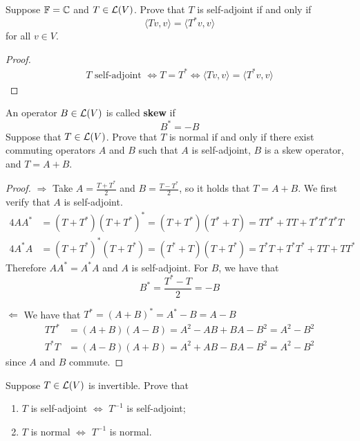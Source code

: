 \documentclass{extarticle}
\begin{document}
\begin{problem}{10}
    Suppose \(\mathbb{F} = \mathbb{C}\) and \(T \in \mathcal{L}(V)\). Prove that \(T\) is self-adjoint if and only if 
    \[\langle Tv,v \rangle = \langle T^* v,v \rangle\]
    for all \(v \in V\).
\end{problem}

\begin{proof}
\begin{align*}
    T \text{ self-adjoint } \Longleftrightarrow
    T = T^* \Longleftrightarrow \langle Tv,v \rangle = \langle T^*v,v \rangle
\end{align*}
\end{proof}

\begin{problem}{12}
    An operator \(B \in \mathcal{L}(V)\) is called \textbf{skew} if 
    \[B^* = - B\]
    Suppose that \(T \in \mathcal{L}(V)\). Prove that \(T\) is normal if and only if there exist commuting 
    operators \(A\) and \(B\) such that \(A\) is self-adjoint, \(B\) is a skew operator, and 
    \(T = A + B\).
\end{problem}

\begin{proof}
\(\Rightarrow\) Take \(A = \frac{T + T^*}{2}\) and \(B = \frac{T - T^*}{2}\), so it holds that 
\(T = A + B\). We first verify that \(A\) is self-adjoint. 
\begin{align*}
    4AA^* &= (T + T^*)(T + T^*)^* = (T + T^*)(T^* + T) = TT^* + TT + T^*T^* T^*T\\ 
    4A^*A &= (T + T^*)^* (T + T^*) = (T^* + T) (T + T^*) = T^*T + T^*T^* + TT + TT^*
\end{align*}
Therefore \(AA^* = A^*A\) and \(A\) is self-adjoint. For \(B\), we have that 
\[B^* = \frac{T^* - T}{2} = - B\]

\(\Leftarrow\) We have that \(T^* = (A+B)^* = A^* - B = A - B\)
\begin{align*}
    TT^* &= (A+B)(A-B) = A^2 - AB + BA - B^2 = A^2 - B^2 \\ 
    T^*T &= (A - B)(A + B) = A^2 + AB - BA - B^2 = A^2 - B^2
\end{align*}
since \(A\) and \(B\) commute. 
\end{proof}


\begin{problem}{15}
    Suppose \(T \in \mathcal{L}(V)\) is invertible. Prove that 
    \begin{enumerate}[label=(\alph*)]
        \item \(T\) is self-adjoint \(\Longleftrightarrow\) \(T^{-1}\) is self-adjoint; 
        \item \(T\) is normal \(\Longleftrightarrow\) \(T^{-1}\) is normal.
    \end{enumerate}
\end{problem}
\end{document}
